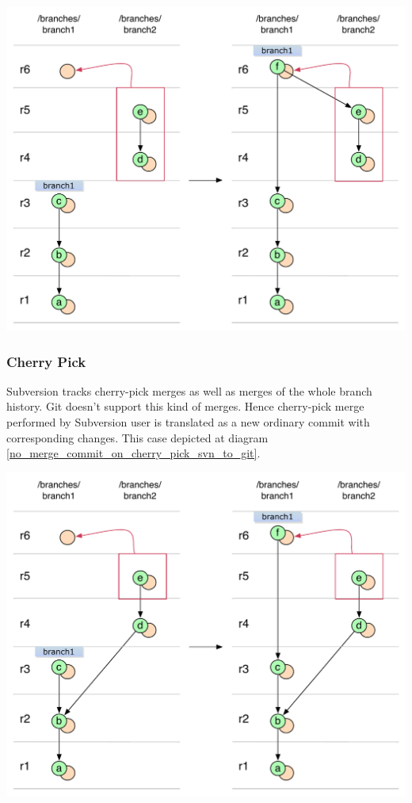 \begin{center}
\includegraphics[width=\textwidth]{img/diagrams/simple_merge_branch_no_parent_svn_to_git.pdf}%
\label{simple_merge_branch_no_parent_svn_to_git}%
\end{center}

\subsubsection{Cherry Pick}

Subversion tracks cherry-pick merges as well as merges of the whole branch history. Git doesn't support this kind of merges. Hence cherry-pick merge performed by Subversion user is translated as a new ordinary commit with corresponding changes. This case depicted at diagram \ref{no_merge_commit_on_cherry_pick_svn_to_git}.

\begin{center}
\includegraphics[width=\textwidth]{img/diagrams/no_merge_commit_on_cherry_pick_svn_to_git.pdf}%
\label{no_merge_commit_on_cherry_pick_svn_to_git}%
\end{center}

